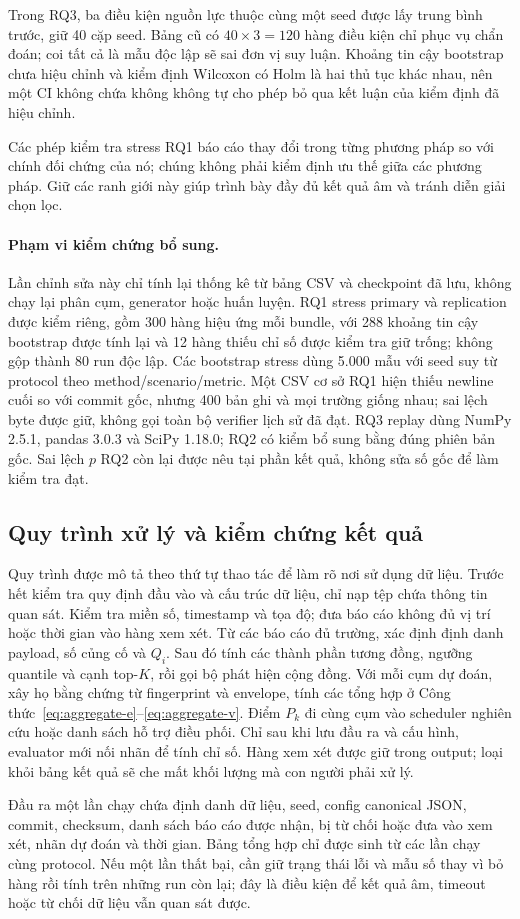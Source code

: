 Trong RQ3, ba điều kiện nguồn lực thuộc cùng một seed được lấy trung bình trước, giữ 40 cặp seed. Bảng cũ có $40\times3=120$ hàng điều kiện chỉ phục vụ chẩn đoán; coi tất cả là mẫu độc lập sẽ sai đơn vị suy luận. Khoảng tin cậy bootstrap chưa hiệu chỉnh và kiểm định Wilcoxon có Holm là hai thủ tục khác nhau, nên một CI không chứa không không tự cho phép bỏ qua kết luận của kiểm định đã hiệu chỉnh.

Các phép kiểm tra stress RQ1 báo cáo thay đổi trong từng phương pháp so với chính đối chứng của nó; chúng không phải kiểm định ưu thế giữa các phương pháp. Giữ các ranh giới này giúp trình bày đầy đủ kết quả âm và tránh diễn giải chọn lọc.

\paragraph{Phạm vi kiểm chứng bổ sung.} Lần chỉnh sửa này chỉ tính lại thống kê từ bảng CSV và checkpoint đã lưu, không chạy lại phân cụm, generator hoặc huấn luyện. RQ1 stress primary và replication được kiểm riêng, gồm 300 hàng hiệu ứng mỗi bundle, với 288 khoảng tin cậy bootstrap được tính lại và 12 hàng thiếu chỉ số được kiểm tra giữ trống; không gộp thành 80 run độc lập. Các bootstrap stress dùng 5.000 mẫu với seed suy từ protocol theo method/scenario/metric. Một CSV cơ sở RQ1 hiện thiếu newline cuối so với commit gốc, nhưng 400 bản ghi và mọi trường giống nhau; sai lệch byte được giữ, không gọi toàn bộ verifier lịch sử đã đạt. RQ3 replay dùng NumPy 2.5.1, pandas 3.0.3 và SciPy 1.18.0; RQ2 có kiểm bổ sung bằng đúng phiên bản gốc. Sai lệch $p$ RQ2 còn lại được nêu tại phần kết quả, không sửa số gốc để làm kiểm tra đạt.

\subsection{Quy trình xử lý và kiểm chứng kết quả}\label{sec:02-reproducibility}
Quy trình được mô tả theo thứ tự thao tác để làm rõ nơi sử dụng dữ liệu. Trước hết kiểm tra quy định đầu vào và cấu trúc dữ liệu, chỉ nạp tệp chứa thông tin quan sát. Kiểm tra miền số, timestamp và tọa độ; đưa báo cáo không đủ vị trí hoặc thời gian vào hàng xem xét. Từ các báo cáo đủ trường, xác định định danh payload, số củng cố và $Q_i$. Sau đó tính các thành phần tương đồng, ngưỡng quantile và cạnh top-$K$, rồi gọi bộ phát hiện cộng đồng. Với mỗi cụm dự đoán, xây họ bằng chứng từ fingerprint và envelope, tính các tổng hợp ở Công thức~\ref{eq:aggregate-e}--\ref{eq:aggregate-v}. Điểm $P_k$ đi cùng cụm vào scheduler nghiên cứu hoặc danh sách hỗ trợ điều phối. Chỉ sau khi lưu đầu ra và cấu hình, evaluator mới nối nhãn để tính chỉ số. Hàng xem xét được giữ trong output; loại khỏi bảng kết quả sẽ che mất khối lượng mà con người phải xử lý.

Đầu ra một lần chạy chứa định danh dữ liệu, seed, config canonical JSON, commit, checksum, danh sách báo cáo được nhận, bị từ chối hoặc đưa vào xem xét, nhãn dự đoán và thời gian. Bảng tổng hợp chỉ được sinh từ các lần chạy cùng protocol. Nếu một lần thất bại, cần giữ trạng thái lỗi và mẫu số thay vì bỏ hàng rồi tính trên những run còn lại; đây là điều kiện để kết quả âm, timeout hoặc từ chối dữ liệu vẫn quan sát được.
